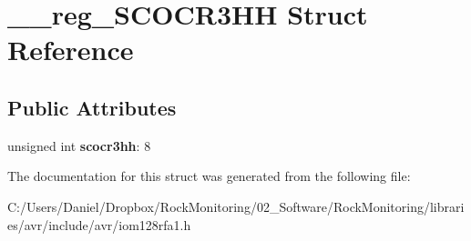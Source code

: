 \hypertarget{struct____reg___s_c_o_c_r3_h_h}{}\section{\+\_\+\+\_\+reg\+\_\+\+S\+C\+O\+C\+R3\+HH Struct Reference}
\label{struct____reg___s_c_o_c_r3_h_h}
\subsection*{Public Attributes}
\begin{DoxyCompactItemize}
\item 
unsigned int {\bfseries scocr3hh}\+: 8\hypertarget{struct____reg___s_c_o_c_r3_h_h_a97b0246c7ff5b99514211f5f48d02193}{}\label{struct____reg___s_c_o_c_r3_h_h_a97b0246c7ff5b99514211f5f48d02193}

\end{DoxyCompactItemize}


The documentation for this struct was generated from the following file\+:\begin{DoxyCompactItemize}
\item 
C\+:/\+Users/\+Daniel/\+Dropbox/\+Rock\+Monitoring/02\+\_\+\+Software/\+Rock\+Monitoring/libraries/avr/include/avr/iom128rfa1.\+h\end{DoxyCompactItemize}
